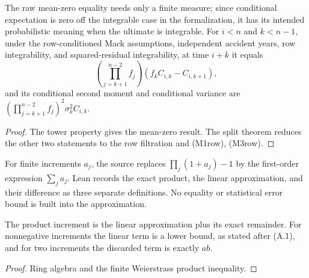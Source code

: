 \begin{theorem}\label{thm:calendarCDR}\leanok
{}
The raw mean-zero equality needs only a finite measure; since conditional expectation is
zero off the integrable case in the formalization, it has its intended probabilistic meaning
when the ultimate is integrable. For $i<n$ and $k<n-1$, under the row-conditioned Mack assumptions, independent accident
years, row integrability, and squared-residual integrability, at time $i+k$ it equals
\[
 \left(\prod_{j=k+1}^{n-2} f_j\right)
 (f_kC_{i,k}-C_{i,k+1}),
\]
and its conditional second moment and conditional variance are
$\left(\prod_{j=k+1}^{n-2}f_j\right)^2\sigma_k^2C_{i,k}$.
\end{theorem}
\begin{proof}\leanok The tower property gives the mean-zero result. The split theorem reduces the other two statements to the row filtration and (M1row), (M3row).\end{proof}

\begin{definition}\label{def:mwA1}\leanok
For finite increments $a_j$, the source replaces
$\prod_j(1+a_j)-1$ by the first-order expression $\sum_j a_j$.
Lean records the exact product, the linear approximation, and their difference
as three separate definitions. No equality or statistical error bound is built
into the approximation.
\end{definition}

\begin{theorem}\label{thm:mwA1}\leanok
{}
The product increment is the linear approximation plus its exact remainder.
For nonnegative increments the linear term is a lower bound, as stated after
(A.1), and for two increments the discarded term is exactly $ab$.
\end{theorem}
\begin{proof}\leanok Ring algebra and the finite Weierstrass product inequality.\end{proof}

